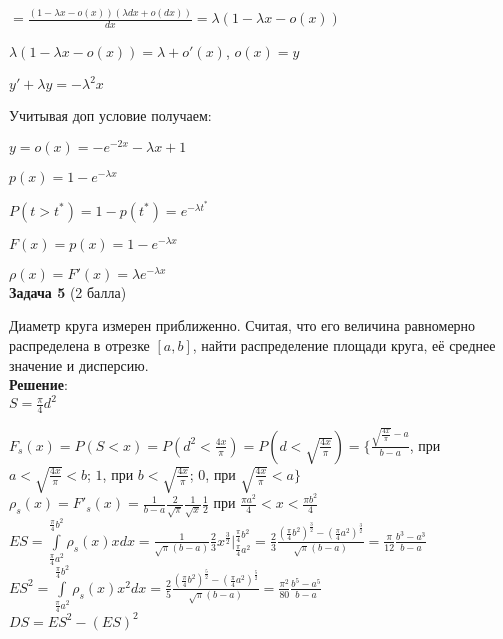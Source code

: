 \documentclass{article}
\begin{document}
$= \frac{(1 - \lambda x - o(x))(\lambda dx + o(dx))}{dx} = \lambda(1-\lambda x - o(x))$

$\lambda(1-\lambda x - o(x)) = \lambda + o'(x)$, $o(x) = y$

$y' + \lambda y = -\lambda^2x$

Учитывая доп условие получаем:

$y = o(x) = -e^{-2x} - \lambda x +1$

$p(x) = 1 - e^{-\lambda x}$

$P(t>t^*) = 1 - p(t^*) = e^{-\lambda t^*}$

$F(x) = p(x) = 1 - e^{-\lambda x}$

$\rho (x) = F'(x) = \lambda e^{-\lambda x}$\\

\textbf{Задача 5} (2 балла)

Диаметр круга измерен приближенно. Считая, что его величина равномерно распределена в отрезке $[a, b]$, найти распределение площади круга, её среднее значение и дисперсию.\\

\textbf{Решение}:\\

$S = \frac{\pi}{4}d^2$

$F_s(x) = P(S < x) = P(d^2 < \frac{4x}{\pi}) = P(d < \sqrt{\frac{4x}{\pi}}) = \lbrace \frac{\sqrt{\frac{4x}{\pi}} - a}{b - a}$, при $ a < \sqrt{\frac{4x}{\pi}} < b$; $1$, при $b<\sqrt{\frac{4x}{\pi}}$; $0$, при $\sqrt{\frac{4x}{\pi}} < a \rbrace$\\

$\rho_s(x) = F'_s(x) = \frac{1}{b-a}\frac{2}{\sqrt{\pi}}\frac{1}{\sqrt{x}}\frac{1}{2}$ при $\frac{\pi a^2}{4} < x < \frac{\pi b^2}{4}$\\

$ES = \int\limits_{\frac{\pi}{4}a^2}^{\frac{\pi}{4}b^2} \rho_s(x)xdx = \frac{1}{\sqrt{\pi}(b-a)}\frac{2}{3}x^{\frac{3}{2}}\vert^{\frac{\pi}{4}b^2}_{\frac{\pi}{4}a^2} = \frac{2}{3}\frac{(\frac{\pi}{4}b^2)^{\frac{3}{2}}-(\frac{\pi}{4}a^2)^{\frac{3}{2}}}{\sqrt{\pi}(b-a)} = \frac{\pi}{12}\frac{b^3-a^3}{b-a}$\\

$ES^2 = \int\limits_{\frac{\pi}{4}a^2}^{\frac{\pi}{4}b^2} \rho_s(x)x^2dx = \frac{2}{5}\frac{(\frac{\pi}{4}b^2)^{\frac{5}{2}}-(\frac{\pi}{4}a^2)^{\frac{5}{2}}}{\sqrt{\pi}(b-a)} = \frac{\pi^2}{80}\frac{b^5-a^5}{b-a}$\\

$DS = ES^2 - (ES)^2$ \\
\end{document}
